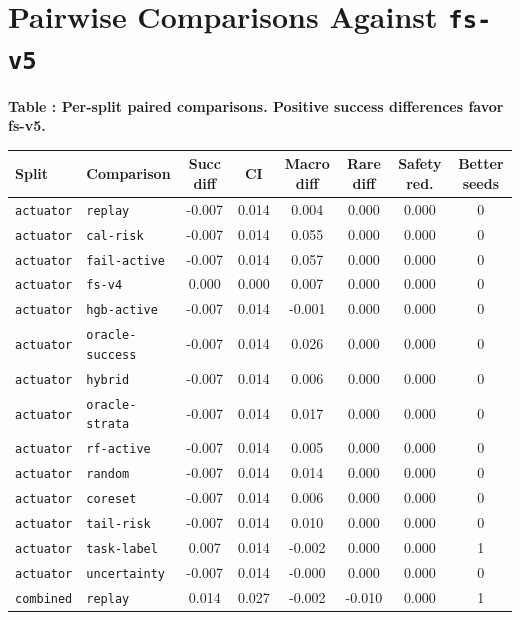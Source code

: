 \documentclass{article}
\begin{document}
\section{Pairwise Comparisons Against \texttt{fs-v5}}
\tiny
\setlength{\tabcolsep}{2pt}
\begin{center}
\label{tab:pairwise}\textbf{Table \thetable: Per-split paired comparisons. Positive success differences favor fs-v5.}\\[0.4ex]
\begin{tabular}{llcccccc}
\toprule
Split & Comparison & Succ diff & CI & Macro diff & Rare diff & Safety red. & Better seeds \\
\midrule
\texttt{actuator} & \texttt{replay} & -0.007 & 0.014 & 0.004 & 0.000 & 0.000 & 0 \\
\texttt{actuator} & \texttt{cal-risk} & -0.007 & 0.014 & 0.055 & 0.000 & 0.000 & 0 \\
\texttt{actuator} & \texttt{fail-active} & -0.007 & 0.014 & 0.057 & 0.000 & 0.000 & 0 \\
\texttt{actuator} & \texttt{fs-v4} & 0.000 & 0.000 & 0.007 & 0.000 & 0.000 & 0 \\
\texttt{actuator} & \texttt{hgb-active} & -0.007 & 0.014 & -0.001 & 0.000 & 0.000 & 0 \\
\texttt{actuator} & \texttt{oracle-success} & -0.007 & 0.014 & 0.026 & 0.000 & 0.000 & 0 \\
\texttt{actuator} & \texttt{hybrid} & -0.007 & 0.014 & 0.006 & 0.000 & 0.000 & 0 \\
\texttt{actuator} & \texttt{oracle-strata} & -0.007 & 0.014 & 0.017 & 0.000 & 0.000 & 0 \\
\texttt{actuator} & \texttt{rf-active} & -0.007 & 0.014 & 0.005 & 0.000 & 0.000 & 0 \\
\texttt{actuator} & \texttt{random} & -0.007 & 0.014 & 0.014 & 0.000 & 0.000 & 0 \\
\texttt{actuator} & \texttt{coreset} & -0.007 & 0.014 & 0.006 & 0.000 & 0.000 & 0 \\
\texttt{actuator} & \texttt{tail-risk} & -0.007 & 0.014 & 0.010 & 0.000 & 0.000 & 0 \\
\texttt{actuator} & \texttt{task-label} & 0.007 & 0.014 & -0.002 & 0.000 & 0.000 & 1 \\
\texttt{actuator} & \texttt{uncertainty} & -0.007 & 0.014 & -0.000 & 0.000 & 0.000 & 0 \\
\texttt{combined} & \texttt{replay} & 0.014 & 0.027 & -0.002 & -0.010 & 0.000 & 1 \\

\end{tabular}
\end{center}
\end{document}
